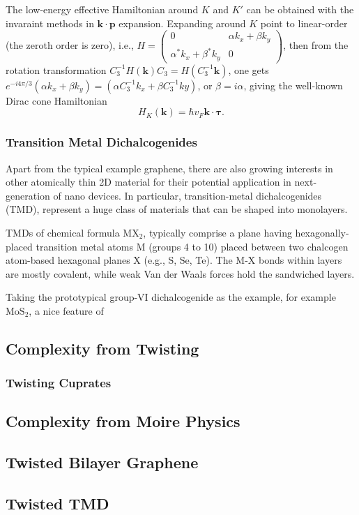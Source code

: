             The low-energy effective Hamiltonian around $K$ and $K'$ can be obtained with the invaraint methods in $\bm k\cdot\bm p$ expansion. Expanding around $K$ point to linear-order (the zeroth order is zero), i.e., $H=\begin{pmatrix}0 & \alpha k_x+\beta k_y \\ \alpha^* k_x+\beta^* k_y & 0\end{pmatrix}$, then from the rotation transformation $C_3^{-1}H(\bm k)C_3=H(C_3^{-1}\bm k)$, one gets $e^{-i4\pi/3}(\alpha k_x+\beta k_y)=(\alpha C_3^{-1}k_x+\beta C_3^{-1}ky)$, or $\beta=i\alpha$, giving the well-known Dirac cone Hamiltonian
            \begin{equation}
                H_K(\bm k)=\hbar v_F\bm k\cdot\bm\tau.
            \end{equation}



        \subsubsection{Transition Metal Dichalcogenides}
            Apart from the typical example graphene, there are also growing interests in other atomically thin 2D material for their potential application in next-generation of nano devices. In particular, transition-metal dichalcogenides (TMD), represent a huge class of materials that can be shaped into monolayers.

            TMDs of chemical formula $\mathrm{MX}_2$, typically comprise a plane having hexagonally-placed transition metal atoms M (groups 4 to 10) placed between two chalcogen atom-based hexagonal planes X (e.g., S, Se, Te). The M-X bonds within layers are mostly covalent, while weak Van der Waals forces hold the sandwiched layers.

            Taking the prototypical group-VI dichalcogenide as the example, for example $\mathrm{MoS_2}$, a nice feature of 

    \subsection{Complexity from Twisting}
        \subsubsection{Twisting Cuprates}


    \subsection{Complexity from Moire Physics}
        \subsection{Twisted Bilayer Graphene}
            
        \subsection{Twisted TMD}